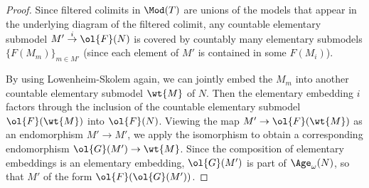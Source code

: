 \begin{proof}
Since filtered colimits in $\Mod(T)$ are unions of the models that appear in the underlying diagram of the filtered colimit, any countable elementary submodel $M' \overset{i}{\to} \ol{F}(N)$ is covered by countably many elementary submodels $\{F(M_m)\}_{m \in M'}$ (since each element of $M'$ is contained in some $F(M_i)$).

  By using Lowenheim-Skolem again, we can jointly embed the $M_m$ into another countable elementary submodel $\wt{M}$ of $N$. Then the elementary embedding $i$ factors through the inclusion of the countable elementary submodel $\ol{F}(\wt{M})$ into $\ol{F}(N)$. Viewing the map $M' \to \ol{F}(\wt{M})$ as an endomorphism $M' \to M'$, we apply the isomorphism to obtain a corresponding endomorphism $\ol{G}(M') \to \wt{M}$. Since the composition of elementary embeddings is an elementary embedding, $\ol{G}(M')$ is part of $\Age_{\omega}(N)$, so that $M'$ of the form $\ol{F}(\ol{G}(M'))$.
\end{proof}
